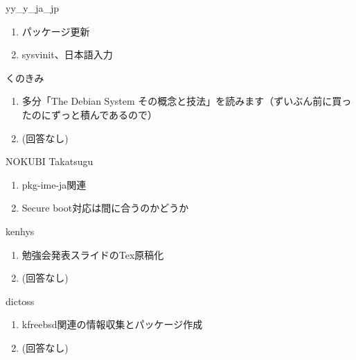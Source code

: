 \begin{prework}{ yy\_y\_ja\_jp }
  \begin{enumerate}
  \item パッケージ更新
  \item sysvinit、日本語入力
  \end{enumerate}
\end{prework}

\begin{prework}{ くのきみ }
  \begin{enumerate}
  \item 多分「The Debian System その概念と技法」を読みます（ずいぶん前に買ったのにずっと積んであるので）
  \item (回答なし)
  \end{enumerate}
\end{prework}

\begin{prework}{ NOKUBI Takatsugu }
  \begin{enumerate}
  \item pkg-ime-ja関連
  \item Secure boot対応は間に合うのかどうか
  \end{enumerate}
\end{prework}

\begin{prework}{ kenhys }
  \begin{enumerate}
  \item 勉強会発表スライドのTex原稿化
  \item (回答なし)
  \end{enumerate}
\end{prework}

\begin{prework}{ dictoss }
  \begin{enumerate}
  \item kfreebsd関連の情報収集とパッケージ作成
  \item (回答なし)
  \end{enumerate}
\end{prework}
